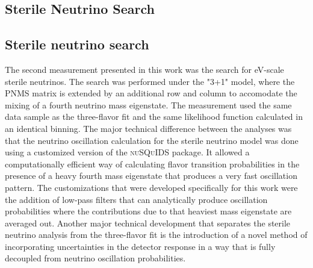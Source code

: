 \subsection{Sterile Neutrino Search}
\label{sec:summary-sterile-osc}


\subsection{Sterile neutrino search}
The second measurement presented in this work was the search for eV-scale sterile neutrinos. The search was performed under the "3+1" model, where the PNMS matrix is extended by an additional row and column to accomodate the mixing of a fourth neutrino mass eigenstate. The measurement used the same data sample as the three-flavor fit and the same likelihood function calculated in an identical binning. The major technical difference between the analyses was that the neutrino oscillation calculation for the sterile neutrino model was done using a customized version of the \textsc{nuSQuIDS} package. It allowed a computationally efficient way of calculating flavor transition probabilities in the presence of a heavy fourth mass eigenstate that produces a very fast oscillation pattern. The customizations that were developed specifically for this work were the addition of low-pass filters that can analytically produce oscillation probabilities where the contributions due to that heaviest mass eigenstate are averaged out. Another major technical development that separates the sterile neutrino analysis from the three-flavor fit is the introduction of a novel method of incorporating uncertainties in the detector response in a way that is fully decoupled from neutrino oscillation probabilities.

